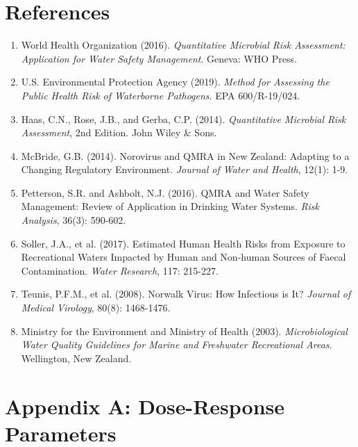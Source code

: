 \documentclass[11pt,a4paper]{article}
\begin{document}
\newpage

\section{References}

\begin{enumerate}[leftmargin=*]
    \item World Health Organization (2016). \textit{Quantitative Microbial Risk Assessment: Application for Water Safety Management}. Geneva: WHO Press.

    \item U.S. Environmental Protection Agency (2019). \textit{Method for Assessing the Public Health Risk of Waterborne Pathogens}. EPA 600/R-19/024.

    \item Haas, C.N., Rose, J.B., and Gerba, C.P. (2014). \textit{Quantitative Microbial Risk Assessment}, 2nd Edition. John Wiley \& Sons.

    \item McBride, G.B. (2014). Norovirus and QMRA in New Zealand: Adapting to a Changing Regulatory Environment. \textit{Journal of Water and Health}, 12(1): 1-9.

    \item Petterson, S.R. and Ashbolt, N.J. (2016). QMRA and Water Safety Management: Review of Application in Drinking Water Systems. \textit{Risk Analysis}, 36(3): 590-602.

    \item Soller, J.A., et al. (2017). Estimated Human Health Risks from Exposure to Recreational Waters Impacted by Human and Non-human Sources of Faecal Contamination. \textit{Water Research}, 117: 215-227.

    \item Teunis, P.F.M., et al. (2008). Norwalk Virus: How Infectious is It? \textit{Journal of Medical Virology}, 80(8): 1468-1476.

    \item Ministry for the Environment and Ministry of Health (2003). \textit{Microbiological Water Quality Guidelines for Marine and Freshwater Recreational Areas}. Wellington, New Zealand.
\end{enumerate}

\newpage

\appendix

\section{Appendix A: Dose-Response Parameters}
\end{document}
